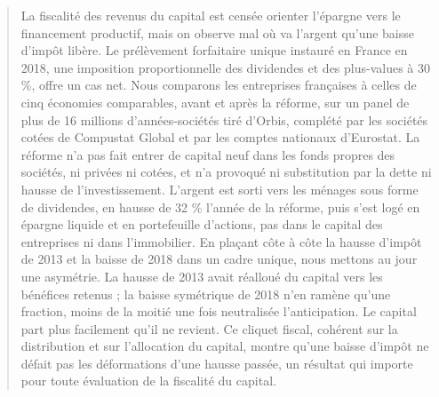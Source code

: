 \begin{abstract}
\noindent
La fiscalité des revenus du capital est censée orienter l'épargne vers le financement
productif, mais on observe mal où va l'argent qu'une baisse d'impôt libère. Le prélèvement
forfaitaire unique instauré en France en 2018, une imposition proportionnelle des dividendes et
des plus-values à 30 \%, offre un cas net. Nous comparons les entreprises françaises à
celles de cinq économies comparables, avant et après la réforme, sur un panel de plus de
16 millions d'années-sociétés tiré d'Orbis, complété par les sociétés cotées de Compustat
Global et par les comptes nationaux d'Eurostat. La réforme n'a pas fait entrer de capital neuf
dans les fonds propres des sociétés, ni privées ni cotées, et n'a provoqué ni substitution par la
dette ni hausse de l'investissement. L'argent est sorti vers les ménages sous forme de dividendes,
en hausse de 32 \% l'année de la réforme, puis s'est logé en épargne liquide et en
portefeuille d'actions, pas dans le capital des entreprises ni dans l'immobilier. En plaçant côte à
côte la hausse d'impôt de 2013 et la baisse de 2018 dans un cadre unique, nous mettons au jour une
asymétrie. La hausse de 2013 avait réalloué du capital vers les bénéfices retenus ; la baisse
symétrique de 2018 n'en ramène qu'une fraction, moins de la moitié une fois neutralisée
l'anticipation. Le capital part plus facilement qu'il ne revient. Ce cliquet fiscal, cohérent sur
la distribution et sur l'allocation du capital, montre qu'une baisse d'impôt ne défait pas les
déformations d'une hausse passée, un résultat qui importe pour toute évaluation de la fiscalité du
capital.
\end{abstract}
